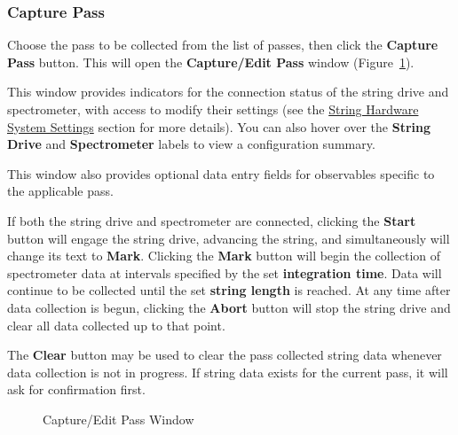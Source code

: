 \documentclass[10pt,letterpaper,titlepage]{article}
\begin{document}
    \subsubsection{Capture Pass}
    Choose the pass to be collected from the list of passes, then click the \textbf{Capture Pass} button. This will open the \textbf{Capture/Edit Pass} window (Figure~\ref{fig:capture_edit_pass}).\par
    This window provides indicators for the connection status of the string drive and spectrometer, with access to modify their settings (see the \hyperref[sec:string_hardware_settings]{String Hardware System Settings} section for more details). You can also hover over the \textbf{String Drive} and \textbf{Spectrometer} labels to view a configuration summary.\par
    This window also provides optional data entry fields for observables specific to the applicable pass.\par
    If both the string drive and spectrometer are connected, clicking the \textbf{Start} button will engage the string drive, advancing the string, and simultaneously will change its text to \textbf{Mark}. Clicking the \textbf{Mark} button will begin the collection of spectrometer data at intervals specified by the set \textbf{integration time}. Data will continue to be collected until the set \textbf{string length} is reached. At any time after data collection is begun, clicking the \textbf{Abort} button will stop the string drive and clear all data collected up to that point.\par
    The \textbf{Clear} button may be used to clear the pass collected string data whenever data collection is not in progress. If string data exists for the current pass, it will ask for confirmation first.
    \begin{figure}[h]
        \centering
        \caption{Capture/Edit Pass Window}
        \label{fig:capture_edit_pass}
    \end{figure}
    \newpage
\end{document}
